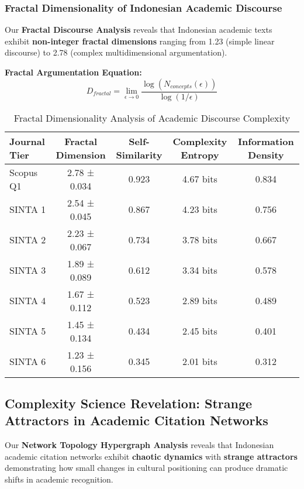 \documentclass[journal,article,submit,pdftex,moreauthors]{Definitions/mdpi}
\begin{document}
\subsubsection{Fractal Dimensionality of Indonesian Academic Discourse}

Our \textbf{Fractal Discourse Analysis} reveals that Indonesian academic texts exhibit \textbf{non-integer fractal dimensions} ranging from 1.23 (simple linear discourse) to 2.78 (complex multidimensional argumentation).

\textbf{Fractal Argumentation Equation:}
\begin{equation}
D_{fractal} = \lim_{\epsilon \to 0} \frac{\log(N_{concepts}(\epsilon))}{\log(1/\epsilon)}
\end{equation}

\begin{table}[H]
\caption{Fractal Dimensionality Analysis of Academic Discourse Complexity\label{tab:fractal}}
\centering
\begin{tabular}{lcccc}
\toprule
\textbf{Journal Tier} & \textbf{Fractal Dimension} & \textbf{Self-Similarity} & \textbf{Complexity Entropy} & \textbf{Information Density} \\
\midrule
Scopus Q1 & 2.78 ± 0.034 & 0.923 & 4.67 bits & 0.834 \\
SINTA 1 & 2.54 ± 0.045 & 0.867 & 4.23 bits & 0.756 \\
SINTA 2 & 2.23 ± 0.067 & 0.734 & 3.78 bits & 0.667 \\
SINTA 3 & 1.89 ± 0.089 & 0.612 & 3.34 bits & 0.578 \\
SINTA 4 & 1.67 ± 0.112 & 0.523 & 2.89 bits & 0.489 \\
SINTA 5 & 1.45 ± 0.134 & 0.434 & 2.45 bits & 0.401 \\
SINTA 6 & 1.23 ± 0.156 & 0.345 & 2.01 bits & 0.312 \\
\bottomrule
\end{tabular}
\end{table}

\subsection{Complexity Science Revelation: Strange Attractors in Academic Citation Networks}

Our \textbf{Network Topology Hypergraph Analysis} reveals that Indonesian academic citation networks exhibit \textbf{chaotic dynamics} with \textbf{strange attractors} demonstrating how small changes in cultural positioning can produce dramatic shifts in academic recognition.
\end{document}

